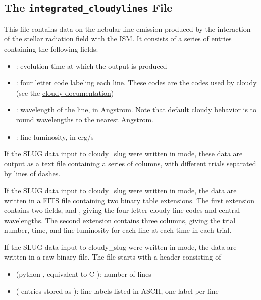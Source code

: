 \documentclass[letterpaper,10pt,english]{sphinxmanual}
\begin{document}
\subsection{The \texttt{integrated\_cloudylines} File}
\label{cloudy:the-integrated-cloudylines-file}
This file contains data on the nebular line emission produced by the
interaction of the stellar radiation field with the ISM. It consists
of a series of entries containing the following fields:
\begin{itemize}
\item {} 
: evolution time at which the output is produced

\item {} 
: four letter code labeling each line. These codes
are the codes used by cloudy (see the \href{http://nublado.org}{cloudy documentation})

\item {} 
: wavelength of the line, in Angstrom. Note that
default cloudy behavior is to round wavelengths to the nearest
Angstrom.

\item {} 
: line luminosity, in erg/s

\end{itemize}

If the SLUG data input to cloudy\_slug were written in  mode,
these data are output as a text file containing a series of columns,
with different trials separated by lines of dashes.

If the SLUG data input to cloudy\_slug were written in  mode,
the data are written in a FITS file containing two binary table
extensions. The first extension contains two fields,  and
, giving the four-letter cloudy line codes and central
wavelengths. The second extension contains three columns, giving the
trial number, time, and line luminosity for each line at each time in
each trial.

If the SLUG data input to cloudy\_slug were written in  mode,
the data are written in a raw binary file. The file starts with a
header consisting of
\begin{itemize}
\item {} 
 (python , equivalent to C ): number of lines

\item {} 
 ( entries stored as ): line
labels listed in ASCII, one label per line

\end{itemize}
\end{document}
